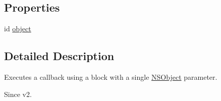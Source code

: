 \subsection*{Properties}
\begin{DoxyCompactItemize}
\item 
id \hyperlink{interface_c_c_call_block_o_a4c593d3153aec9610ec97d388371ce07}{object}
\end{DoxyCompactItemize}


\subsection{Detailed Description}
Executes a callback using a block with a single \hyperlink{class_n_s_object}{N\-S\-Object} parameter. \begin{DoxySince}{Since}
v2. 
\end{DoxySince}


